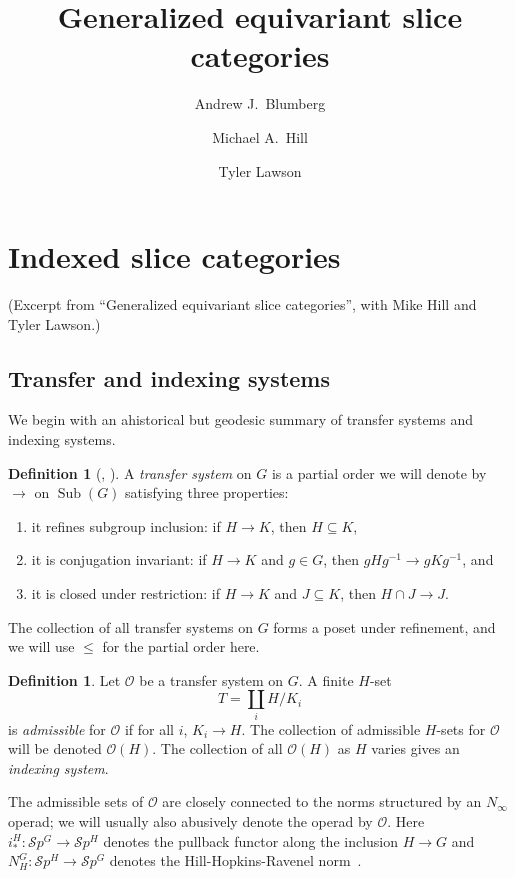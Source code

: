 \documentclass{amsart}
\title{Generalized equivariant slice categories}
\author{Andrew J.~Blumberg}
\author{Michael A.~Hill}
\author{Tyler Lawson}
\DeclareMathOperator{\Sub}{Sub}
\newcommand{\cc}[1]{\mathcal #1}
\newcommand{\cO}{\cc{O}}
\newcommand{\Sp}{\mathcal Sp}
\newcommand{\Ninfty}{N_\infty}
\numberwithin{equation}{section}
\theoremstyle{remark}
\theoremstyle{definition}
\newtheorem{definition}[theorem]{Definition}
\begin{document}
\section{Indexed slice categories}\label{sec: Indexed Slice
  Categories}

(Excerpt from ``Generalized equivariant slice categories'', with Mike
Hill and Tyler Lawson.)

\subsection{Transfer and indexing systems}

We begin with an ahistorical but geodesic summary of transfer systems
and indexing systems.

\begin{definition}[{\cite{BBR}, \cite{Rubin21}}]
    A {\emph{transfer system}} on \(G\) is a partial order we will denote by \(\to\) on \(\Sub(G)\) satisfying three properties:
    \begin{enumerate}
        \item it refines subgroup inclusion: if \(H\to K\), then \(H\subseteq K\),
        \item it is conjugation invariant: if \(H\to K\) and \(g\in G\), then \(gHg^{-1}\to gKg^{-1}\), and
        \item it is closed under restriction: if \(H\to K\) and \(J\subseteq K\), then \(H\cap J\to J\).
    \end{enumerate}
\end{definition}

The collection of all transfer systems on \(G\) forms a poset under refinement, and we will use \(\leq\) for the partial order here.

\begin{definition}
    Let \(\cO\) be a transfer system on \(G\). A finite \(H\)-set 
    \[
        T=\coprod_{i} H/K_i
    \]
    is {\emph{admissible}} for \(\cO\) if for all \(i\), \(K_i\to H\). The collection of admissible \(H\)-sets for \(\cO\) will be denoted \(\cO(H)\). The collection of all \(\cO(H)\) as \(H\) varies gives an {\emph{indexing system}}.
\end{definition}

The admissible sets of $\cO$ are closely connected to the norms
structured by an \(\Ninfty\) operad; we will usually also abusively
denote the operad by \(\cO\). Here $i^H_* \colon \Sp^G \to \Sp^H$
denotes the pullback functor along the inclusion $H \to G$ and $N_H^G
\colon \Sp^H \to \Sp^G$ denotes the Hill-Hopkins-Ravenel
norm~\cite{HHR}.
\end{document}
